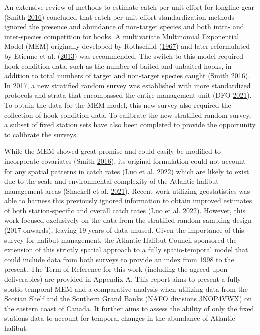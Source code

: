 \documentclass[12pt]{article}\usepackage[]{graphicx}\usepackage[]{color}
\begin{document}
An extensive review of methods to estimate catch per unit effort for longline gear (Smith \protect\hyperlink{ref-Smith2016a}{2016}) concluded that catch per unit effort standardization methods ignored the presence and abundance of non-target species and both intra- and inter-species competition for hooks. A multivariate Multinomial Exponential Model (MEM) originally developed by Rothschild (\protect\hyperlink{ref-Rothschild1967}{1967}) and later reformulated by Etienne et al. (\protect\hyperlink{ref-Etienne2013}{2013}) was recommended. The switch to this model required hook condition data, such as the number of baited and unbaited hooks, in addition to total numbers of target and non-target species caught (Smith \protect\hyperlink{ref-Smith2016a}{2016}). In 2017, a new stratified random survey was established with more standardized protocols and strata that encompassed the entire management unit (DFO \protect\hyperlink{ref-DFO2021}{2021}). To obtain the data for the MEM model, this new survey also required the collection of hook condition data. To calibrate the new stratified random survey, a subset of fixed station sets have also been completed to provide the opportunity to calibrate the surveys.

While the MEM showed great promise and could easily be modified to incorporate covariates (Smith \protect\hyperlink{ref-Smith2016a}{2016}), its original formulation could not account for any spatial patterns in catch rates (Luo et al. \protect\hyperlink{ref-Luo2022}{2022}) which are likely to exist due to the scale and environmental complexity of the Atlantic halibut management areas (Shackell et al. \protect\hyperlink{ref-Shackell2021}{2021}). Recent work utilizing geostatistics was able to harness this previously ignored information to obtain improved estimates of both station-specific and overall catch rates (Luo et al. \protect\hyperlink{ref-Luo2022}{2022}). However, this work focused exclusively on the data from the stratified random sampling design (2017 onwards), leaving 19 years of data unused. Given the importance of this survey for halibut management, the Atlantic Halibut Council sponsored the extension of this strictly spatial approach to a fully spatio-temporal model that could include data from both surveys to provide an index from 1998 to the present. The Term of Reference for this work (including the agreed-upon deliverables) are provided in Appendix A. This report aims to present a fully spatio-temporal MEM and a comparative analysis when utilizing data from the Scotian Shelf and the Southern Grand Banks (NAFO divisions 3NOP4VWX) on the eastern coast of Canada. It further aims to assess the ability of only the fixed stations data to account for temporal changes in the abundance of Atlantic halibut.
\end{document}
